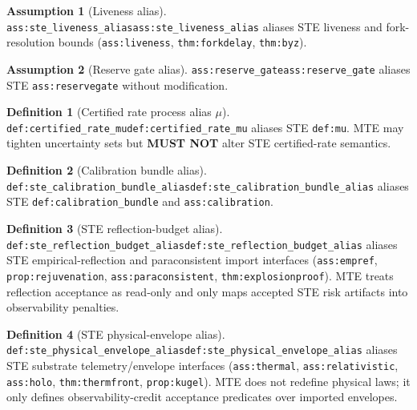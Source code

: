 \documentclass[11pt]{article}
\theoremstyle{definition}
\newtheorem{definition}{Definition}
\newtheorem{assumption}{Assumption}
\theoremstyle{plain}
\newcommand{\MUSTNOT}{\textbf{MUST NOT}}
\newcommand{\STE}{\textsf{STE}}
\newcommand{\MTE}{\textsf{MTE}}
\newcommand{\lbl}[1]{\texttt{\footnotesize\nolinkurl{#1}}}
\newcommand{\DefLabel}[1]{\hfill{\small\lbl{#1}}}
\begin{document}
\begin{assumption}[Liveness alias]\DefLabel{ass:ste_liveness_alias}\label{ass:ste_liveness_alias}
\lbl{ass:ste_liveness_alias} aliases \STE{} liveness and fork-resolution bounds (\lbl{ass:liveness}, \lbl{thm:forkdelay}, \lbl{thm:byz}).
\end{assumption}

\begin{assumption}[Reserve gate alias]\DefLabel{ass:reserve_gate}\label{ass:reserve_gate}
\lbl{ass:reserve_gate} aliases \STE{} \lbl{ass:reservegate} without modification.
\end{assumption}

\begin{definition}[Certified rate process alias $\mu$]\DefLabel{def:certified_rate_mu}\label{def:certified_rate_mu}
\lbl{def:certified_rate_mu} aliases \STE{} \lbl{def:mu}. \MTE{} may tighten uncertainty sets but \MUSTNOT{} alter \STE{} certified-rate semantics.
\end{definition}

\begin{definition}[Calibration bundle alias]\DefLabel{def:ste_calibration_bundle_alias}\label{def:ste_calibration_bundle_alias}
\lbl{def:ste_calibration_bundle_alias} aliases \STE{} \lbl{def:calibration_bundle} and \lbl{ass:calibration}.
\end{definition}

\begin{definition}[STE reflection-budget alias]\DefLabel{def:ste_reflection_budget_alias}\label{def:ste_reflection_budget_alias}
\lbl{def:ste_reflection_budget_alias} aliases \STE{} empirical-reflection and paraconsistent import interfaces
(\lbl{ass:empref}, \lbl{prop:rejuvenation}, \lbl{ass:paraconsistent}, \lbl{thm:explosionproof}).
\MTE{} treats reflection acceptance as read-only and only maps accepted STE risk artifacts into observability penalties.
\end{definition}

\begin{definition}[STE physical-envelope alias]\DefLabel{def:ste_physical_envelope_alias}\label{def:ste_physical_envelope_alias}
\lbl{def:ste_physical_envelope_alias} aliases \STE{} substrate telemetry/envelope interfaces
(\lbl{ass:thermal}, \lbl{ass:relativistic}, \lbl{ass:holo}, \lbl{thm:thermfront}, \lbl{prop:kugel}).
\MTE{} does not redefine physical laws; it only defines observability-credit acceptance predicates over imported envelopes.
\end{definition}
\end{document}
